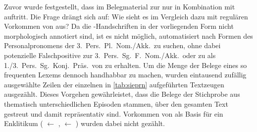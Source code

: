 	





Zuvor wurde festgestellt, dass im Belegmaterial zur \KC{} nur
 in Kombination mit  auftritt. Die Frage drängt sich
auf: Wie sieht es im Vergleich dazu mit regulären Vorkommen von  aus?
Da die \KC{}-Hand\-schrif\-ten in der vorliegenden Form nicht
morphologisch annotiert sind, ist es nicht möglich, automatisiert nach Formen
des Personal\-pronomens der 3.~Pers.\ Pl.\ Nom./Akk.\ zu suchen, ohne dabei
potenzielle Falschpositive zur 3.~Pers.\ Sg.~F.\ Nom./Akk.\ oder zu 
als 1./3.~Pers.\ Sg.\ Konj.\ Präs.\ von   zu erhalten. Um
die Menge der Belege eines so frequenten Lexems dennoch handhabbar zu machen,
wurden eintausend zufällig ausgewählte Zeilen der einzelnen in
\cref{tab:sieprn} aufgeführten Textzeugen ausgezählt. Dieses Vorgehen
gewährleistet, dass die Belege der Stichprobe aus thematisch unterschiedlichen
Episoden stammen, über den gesamten Text gestreut und damit repräsentativ sind.
Vorkommen von  als Basis für ein Enklitikum ( $\gets$
 ,
 $\gets$  ) wurden dabei nicht gezählt.


